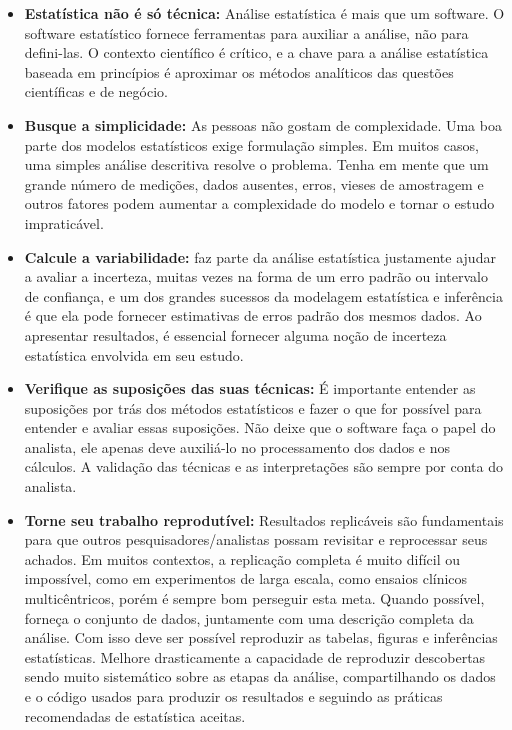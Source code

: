 \documentclass[12pt,]{style/krantz}
\theoremstyle{definition}
\theoremstyle{definition}
\theoremstyle{definition}
\theoremstyle{remark}
\begin{document}
\begin{itemize}
\item
  \textbf{Estatística não é só técnica:} Análise estatística é mais que
  um software. O software estatístico fornece ferramentas para auxiliar
  a análise, não para defini-las. O contexto científico é crítico, e a
  chave para a análise estatística baseada em princípios é aproximar os
  métodos analíticos das questões científicas e de negócio.
\item
  \textbf{Busque a simplicidade:} As pessoas não gostam de complexidade.
  Uma boa parte dos modelos estatísticos exige formulação simples. Em
  muitos casos, uma simples análise descritiva resolve o problema. Tenha
  em mente que um grande número de medições, dados ausentes, erros,
  vieses de amostragem e outros fatores podem aumentar a complexidade do
  modelo e tornar o estudo impraticável.
\item
  \textbf{Calcule a variabilidade:} faz parte da análise estatística
  justamente ajudar a avaliar a incerteza, muitas vezes na forma de um
  erro padrão ou intervalo de confiança, e um dos grandes sucessos da
  modelagem estatística e inferência é que ela pode fornecer estimativas
  de erros padrão dos mesmos dados. Ao apresentar resultados, é
  essencial fornecer alguma noção de incerteza estatística envolvida em
  seu estudo.
\item
  \textbf{Verifique as suposições das suas técnicas:} É importante
  entender as suposições por trás dos métodos estatísticos e fazer o que
  for possível para entender e avaliar essas suposições. Não deixe que o
  software faça o papel do analista, ele apenas deve auxiliá-lo no
  processamento dos dados e nos cálculos. A validação das técnicas e as
  interpretações são sempre por conta do analista.
\item
  \textbf{Torne seu trabalho reprodutível:} Resultados replicáveis são
  fundamentais para que outros pesquisadores/analistas possam revisitar
  e reprocessar seus achados. Em muitos contextos, a replicação completa
  é muito difícil ou impossível, como em experimentos de larga escala,
  como ensaios clínicos multicêntricos, porém é sempre bom perseguir
  esta meta. Quando possível, forneça o conjunto de dados, juntamente
  com uma descrição completa da análise. Com isso deve ser possível
  reproduzir as tabelas, figuras e inferências estatísticas. Melhore
  drasticamente a capacidade de reproduzir descobertas sendo muito
  sistemático sobre as etapas da análise, compartilhando os dados e o
  código usados para produzir os resultados e seguindo as práticas
  recomendadas de estatística aceitas.
\end{itemize}
\end{document}

